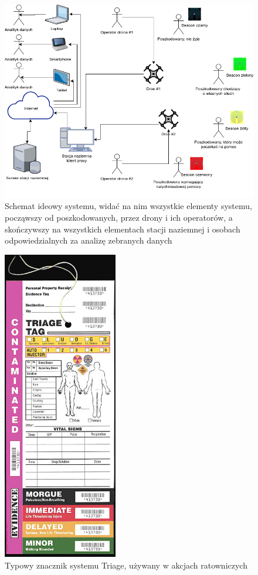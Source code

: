 \begin{figure}[!th]
    \centering
    \includegraphics[width=15cm]{zalaczniki/obrazy/schemat_ideowy.png}
    \caption{Schemat ideowy systemu, widać na nim wszystkie elementy systemu, począwszy od poszkodowanych, przez drony i ich operatorów, a skończywszy na wszystkich elementach stacji naziemnej i osobach odpowiedzialnych za analizę zebranych danych}
    \label{fig:schematIdeowy}
\end{figure}

\begin{figure}[!th]
    \centering
    \includegraphics[width=5cm]{zalaczniki/obrazy/triage_tag.jpg}
    \caption{Typowy znacznik systemu Triage, używany w akcjach ratowniczych \cite{triage}}
    \label{fig:triage}
\end{figure}

